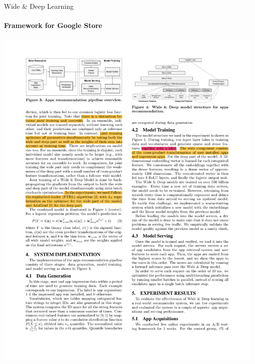 \documentclass{ctexbeamer}
\begin{document}
\begin{frame}{Wide \& Deep Learning}
	\framesubtitle{Framework for Google Store}
	\begin{center}
		\includegraphics[width=1.1\textwidth]{framework/wdl}
	\end{center}
\end{frame}
\end{document}
